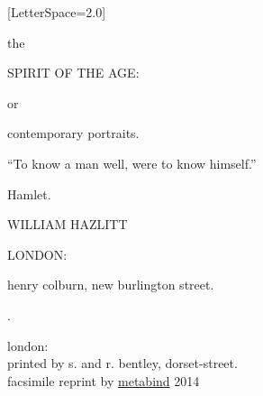 \begingroup%
\thispagestyle{empty}

\setlength{\epigraphwidth}{0.7\textwidth}
\epigraphfontsize{\footnotesize}
\setlength{\epigraphrule}{0pt}

\fontspec{\millerdsc}[LetterSpace=2.0]

\centering

\begingroup %

{\Large the} \par
{}

{\HUGE \mdseries SPIRIT OF THE AGE:} \par
{}

{\large or} \par
{}

{\Huge \mdseries contemporary portraits.} \par
{}

\epigraph{
  ``To know a man well, were to know himself.''
}{\textmd{Hamlet.}} \par
{}

{\Large \mdseries WILLIAM HAZLITT} \par
{}

\begin{DoubleSpace}
{\large \mdseries LONDON:} \par
{\large \mdseries henry colburn, new burlington street.} \par
{\large {}.}
\end{DoubleSpace}

\endgroup %

\cleartoverso

\begingroup%
\thispagestyle{empty}
\vspace*{0.75\textheight}
\begin{DoubleSpace}
{\mdseries london:}\\
{\mdseries printed by s. and r. bentley, dorset-street.}\\
{\footnotesize \mdseries facsimile reprint by
  \href{http://metabind.artworks.studio}{metabind} 2014}
\end{DoubleSpace}
\endgroup%

\endgroup%
\clearpage